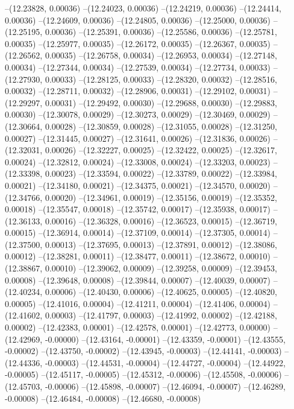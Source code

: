 --(12.23828, 0.00036)
--(12.24023, 0.00036)
--(12.24219, 0.00036)
--(12.24414, 0.00036)
--(12.24609, 0.00036)
--(12.24805, 0.00036)
--(12.25000, 0.00036)
--(12.25195, 0.00036)
--(12.25391, 0.00036)
--(12.25586, 0.00036)
--(12.25781, 0.00035)
--(12.25977, 0.00035)
--(12.26172, 0.00035)
--(12.26367, 0.00035)
--(12.26562, 0.00035)
--(12.26758, 0.00034)
--(12.26953, 0.00034)
--(12.27148, 0.00034)
--(12.27344, 0.00034)
--(12.27539, 0.00034)
--(12.27734, 0.00033)
--(12.27930, 0.00033)
--(12.28125, 0.00033)
--(12.28320, 0.00032)
--(12.28516, 0.00032)
--(12.28711, 0.00032)
--(12.28906, 0.00031)
--(12.29102, 0.00031)
--(12.29297, 0.00031)
--(12.29492, 0.00030)
--(12.29688, 0.00030)
--(12.29883, 0.00030)
--(12.30078, 0.00029)
--(12.30273, 0.00029)
--(12.30469, 0.00029)
--(12.30664, 0.00028)
--(12.30859, 0.00028)
--(12.31055, 0.00028)
--(12.31250, 0.00027)
--(12.31445, 0.00027)
--(12.31641, 0.00026)
--(12.31836, 0.00026)
--(12.32031, 0.00026)
--(12.32227, 0.00025)
--(12.32422, 0.00025)
--(12.32617, 0.00024)
--(12.32812, 0.00024)
--(12.33008, 0.00024)
--(12.33203, 0.00023)
--(12.33398, 0.00023)
--(12.33594, 0.00022)
--(12.33789, 0.00022)
--(12.33984, 0.00021)
--(12.34180, 0.00021)
--(12.34375, 0.00021)
--(12.34570, 0.00020)
--(12.34766, 0.00020)
--(12.34961, 0.00019)
--(12.35156, 0.00019)
--(12.35352, 0.00018)
--(12.35547, 0.00018)
--(12.35742, 0.00017)
--(12.35938, 0.00017)
--(12.36133, 0.00016)
--(12.36328, 0.00016)
--(12.36523, 0.00015)
--(12.36719, 0.00015)
--(12.36914, 0.00014)
--(12.37109, 0.00014)
--(12.37305, 0.00014)
--(12.37500, 0.00013)
--(12.37695, 0.00013)
--(12.37891, 0.00012)
--(12.38086, 0.00012)
--(12.38281, 0.00011)
--(12.38477, 0.00011)
--(12.38672, 0.00010)
--(12.38867, 0.00010)
--(12.39062, 0.00009)
--(12.39258, 0.00009)
--(12.39453, 0.00008)
--(12.39648, 0.00008)
--(12.39844, 0.00007)
--(12.40039, 0.00007)
--(12.40234, 0.00006)
--(12.40430, 0.00006)
--(12.40625, 0.00005)
--(12.40820, 0.00005)
--(12.41016, 0.00004)
--(12.41211, 0.00004)
--(12.41406, 0.00004)
--(12.41602, 0.00003)
--(12.41797, 0.00003)
--(12.41992, 0.00002)
--(12.42188, 0.00002)
--(12.42383, 0.00001)
--(12.42578, 0.00001)
--(12.42773, 0.00000)
--(12.42969, -0.00000)
--(12.43164, -0.00001)
--(12.43359, -0.00001)
--(12.43555, -0.00002)
--(12.43750, -0.00002)
--(12.43945, -0.00003)
--(12.44141, -0.00003)
--(12.44336, -0.00003)
--(12.44531, -0.00004)
--(12.44727, -0.00004)
--(12.44922, -0.00005)
--(12.45117, -0.00005)
--(12.45312, -0.00006)
--(12.45508, -0.00006)
--(12.45703, -0.00006)
--(12.45898, -0.00007)
--(12.46094, -0.00007)
--(12.46289, -0.00008)
--(12.46484, -0.00008)
--(12.46680, -0.00008)
